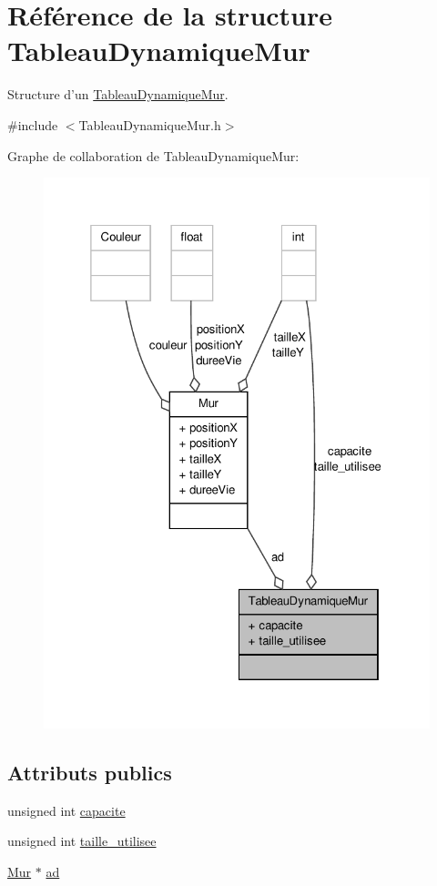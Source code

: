 \hypertarget{structTableauDynamiqueMur}{\section{Référence de la structure Tableau\-Dynamique\-Mur}
\label{structTableauDynamiqueMur}
}


Structure d'un \hyperlink{structTableauDynamiqueMur}{Tableau\-Dynamique\-Mur}.  




{\ttfamily \#include $<$Tableau\-Dynamique\-Mur.\-h$>$}



Graphe de collaboration de Tableau\-Dynamique\-Mur\-:
\nopagebreak
\begin{figure}[H]
\begin{center}
\leavevmode
\includegraphics[width=325pt]{structTableauDynamiqueMur__coll__graph}
\end{center}
\end{figure}
\subsection*{Attributs publics}
\begin{DoxyCompactItemize}
\item 
unsigned int \hyperlink{structTableauDynamiqueMur_a3ac67653487ce5f4ae8e1c2626469f45}{capacite}
\item 
unsigned int \hyperlink{structTableauDynamiqueMur_a10c3a4a33a8a9071a70788920a8459b5}{taille\-\_\-utilisee}
\item 
\hyperlink{structMur}{Mur} $\ast$ \hyperlink{structTableauDynamiqueMur_a922754666b4214fea4cb56fdacddc2e4}{ad}
\end{DoxyCompactItemize}


